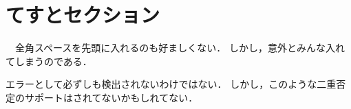 \section{てすとセクション}

　全角スペースを先頭に入れるのも好ましくない．
しかし，意外とみんな入れてしまうのである．

エラーとして必ずしも検出されないわけではない．
しかし，このような二重否定のサポートはされてないかもしれてない．
